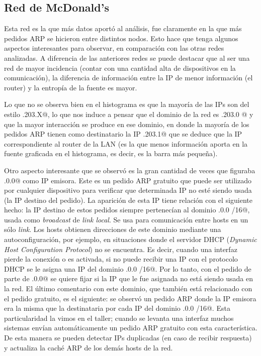 \subsection{Red de McDonald's}

Esta red es la que m\'as datos aport\'o al an\'alisis, fue claramente en la que m\'as pedidos ARP
se hicieron entre distintos nodos. Esto hace que tenga algunos aspectos interesantes para observar,
en comparaci\'on con las otras redes analizadas. A diferencia de las anteriores redes se puede 
destacar que al ser una red de mayor incidencia (contar con una cantidad alta de dispositivos 
en la comunicaci\'on), la diferencia de informaci\'on entre la IP de menor informaci\'on (el router) 
y la entrop\'ia de la fuente es mayor.

Lo que no se observa bien en el histograma es que la mayor\'ia de las IPs son del estilo 
.203.X@, lo que nos induce a pensar que el dominio de la red es .203.0 @
y que la mayor interacci\'on se produce en ese dominio, en donde la mayor\'ia de los pedidos ARP
tienen como destinatario la IP .203.1@ que se deduce que la IP correspondiente al 
router de la LAN (es la que menos informaci\'on aporta en la fuente graficada en el histograma, es
decir, es la barra m\'as peque\~na). 

Otro aspecto interesante que se observ\'o es la gran cantidad de veces que figuraba .0.0@
como IP emisora. Este es un pedido ARP gratuito que puede ser utilizado por cualquier dispositivo
para verificar que determinada IP no est\'e siendo usada (la IP destino del pedido). La aparici\'on
de esta IP tiene relaci\'on con el siguiente hecho: la IP destino de estos pedidos siempre 
pertenec\'ian al dominio .0.0 /16@, usada como \emph{broadcast} de \emph{link local}. Se
usa para comunicaci\'on entre hosts en un s\'olo \emph{link}. Los hosts obtienen direcciones de este
dominio mediante una autoconfiguraci\'on, por ejemplo, en situaciones donde el servidor DHCP 
(\emph{Dynamic Host Configuration Protocol}) no se encuentra. Es decir, cuando una interfaz pierde
la conexi\'on o es activada, si no puede recibir una IP con el protocolo DHCP se le asigna una IP
del dominio .0.0 /16@. Por lo tanto, con el pedido de parte de .0.0@ se 
quiere fijar si la IP que le fue asignada no est\'a siendo usada en la red. El \'ultimo comentario
con este dominio, que tambi\'en est\'a relacionado con el pedido gratuito, es el siguiente: se 
observ\'o un pedido ARP donde la IP emisora era la misma que la destinataria por cada IP del dominio .0.0 /16@. Esta particularidad la vimos en el taller; cuando se levanta una interfaz
muchos sistemas env\'ian autom\'aticamente un pedido ARP gratuito con esta caracter\'istica. De esta
manera se pueden detectar IPs duplicadas (en caso de recibir respuesta) y actualiza	la cach\'e ARP
de los dem\'as hosts de la red.


